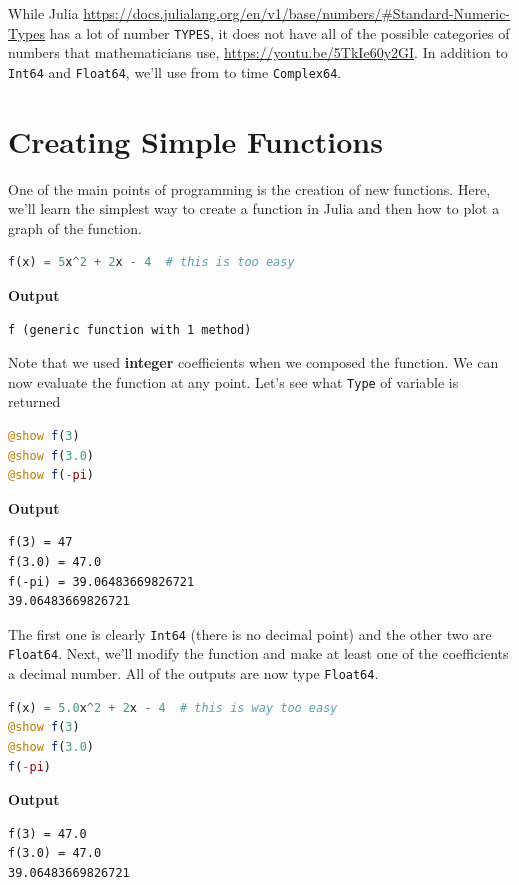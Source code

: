 \begin{rem}
 While Julia \url{https://docs.julialang.org/en/v1/base/numbers/#Standard-Numeric-Types} has a lot of number \texttt{TYPES}, it does not have all of the possible categories of numbers that mathematicians use, \url{https://youtu.be/5TkIe60y2GI}. In addition to \texttt{Int64} and \texttt{Float64}, we'll use from to time \texttt{Complex64}. 
\end{rem}

\section{Creating Simple Functions}

One of the main points of programming is the creation of new functions. Here, we'll learn the simplest way to create a function in Julia and then how to plot a graph of the function.

\begin{lstlisting}[language=Julia,style=mystyle]
f(x) = 5x^2 + 2x - 4  # this is too easy
\end{lstlisting}
\textbf{Output} 
\begin{verbatim}
f (generic function with 1 method)
\end{verbatim}

Note that we used \textbf{integer} coefficients when we composed the function.  
We can now evaluate the function at any point. Let's see what \texttt{Type} of variable is returned

\begin{lstlisting}[language=Julia,style=mystyle]
@show f(3)
@show f(3.0)
@show f(-pi)
\end{lstlisting}
\textbf{Output} 
\begin{verbatim}
f(3) = 47
f(3.0) = 47.0
f(-pi) = 39.06483669826721
39.06483669826721
\end{verbatim}
The first one is clearly \texttt{Int64} (there is no decimal point) and the other two are \texttt{Float64}. Next, we'll modify the function and make at least one of the coefficients a decimal number. All of the outputs are now type \texttt{Float64}.

\begin{lstlisting}[language=Julia,style=mystyle]
f(x) = 5.0x^2 + 2x - 4  # this is way too easy
@show f(3)
@show f(3.0)
f(-pi)
\end{lstlisting}
\textbf{Output} 
\begin{verbatim}
f(3) = 47.0
f(3.0) = 47.0
39.06483669826721
\end{verbatim}

